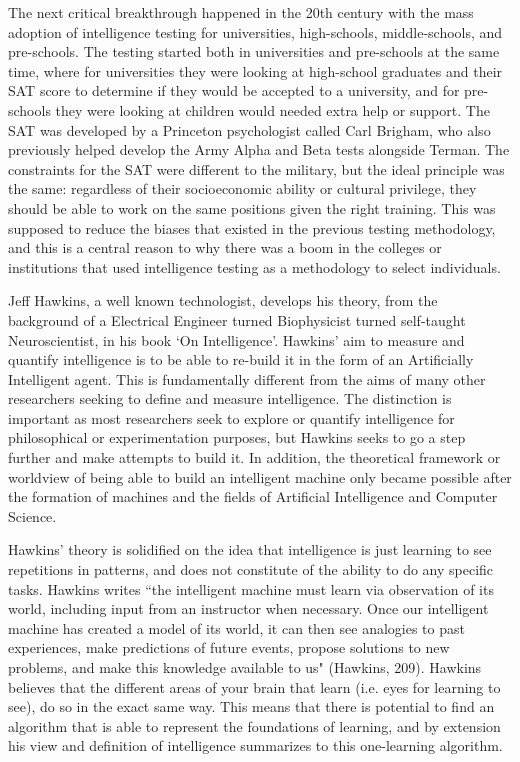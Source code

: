 \documentclass[12pt, oneside]{article}
\begin{document}
\par The next critical breakthrough happened in the 20th century with the mass adoption of intelligence testing for universities, high-schools, middle-schools, and pre-schools. The testing started both in universities and pre-schools at the same time, where for universities they were looking at high-school graduates and their SAT score to determine if they would be accepted to a university, and for pre-schools they were looking at children would needed extra help or support. The SAT was developed by a Princeton psychologist called Carl Brigham, who also previously helped develop the Army Alpha and Beta tests alongside Terman. The constraints for the SAT were different to the military, but the ideal principle was the same: regardless of their socioeconomic ability or cultural privilege, they should be able to work on the same positions given the right training. This was supposed to reduce the biases that existed in the previous testing methodology, and this is a central reason to why there was a boom in the colleges or institutions that used intelligence testing as a methodology to select individuals.

\par Jeff Hawkins, a well known technologist, develops his theory, from the background of a Electrical Engineer turned Biophysicist turned self-taught Neuroscientist, in his book `On Intelligence'. Hawkins' aim to measure and quantify intelligence is to be able to re-build it in the form of an Artificially Intelligent agent. This is fundamentally different from the aims of many other researchers seeking to define and measure intelligence. The distinction is important as most researchers seek to explore or quantify intelligence for philosophical or experimentation purposes, but Hawkins seeks to go a step further and make attempts to build it. In addition, the theoretical framework or worldview of being able to build an intelligent machine only became possible after the formation of machines and the fields of Artificial Intelligence and Computer Science.

\par Hawkins' theory is solidified on the idea that intelligence is just learning to see repetitions in patterns, and does not constitute of the ability to do any specific tasks. Hawkins writes ``the intelligent machine must learn via observation of its world, including input from an instructor when necessary. Once our intelligent machine has created a model of its world, it can then see analogies to past experiences, make predictions of future events, propose solutions to new problems, and make this knowledge available to us" (Hawkins, 209). Hawkins believes that the different areas of your brain that learn (i.e. eyes for learning to see), do so in the exact same way. This means that there is potential to find an algorithm that is able to represent the foundations of learning, and by extension his view and definition of intelligence summarizes to this one-learning algorithm.
\end{document}
